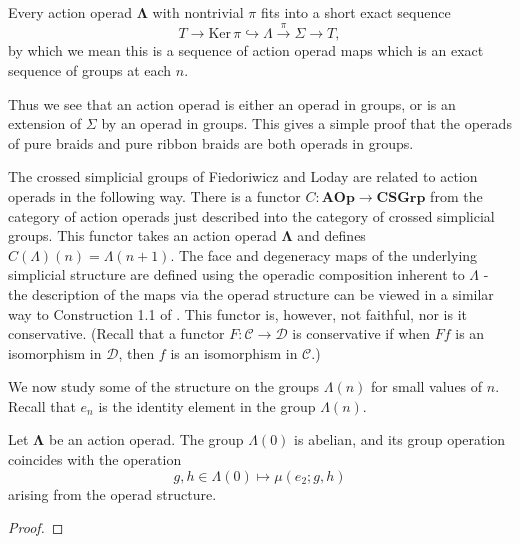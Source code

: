 \documentclass{amsbook} %
\newcommand{\ML}{\mathbf{\Lambda}}
\numberwithin{section}{chapter}
\begin{document}
\begin{cor}\label{extension}
Every action operad $\ML$ with nontrivial $\pi$ fits into a short exact sequence
  \[
    T \rightarrow \textrm{Ker}\,\pi \hookrightarrow \Lambda \stackrel{\pi}{\longrightarrow} \Sigma \rightarrow T,
  \]
by which we mean this is a sequence of action operad maps which is an exact sequence of groups at each $n$.
\end{cor}

\begin{rem}
Thus we see that an action operad is either an operad in groups, or is an extension of $\Sigma$ by an operad in groups. This gives a simple proof that the operads of pure braids and pure ribbon braids are both operads in groups.
\end{rem}

\begin{rem}\label{rem:crossed}
The crossed simplicial groups of Fiedoriwicz and Loday \cite{FL91} are related to action operads in the following way. There is a functor $C \colon \mathbf{AOp} \rightarrow \mathbf{CSGrp}$ from the category of action operads just described into the category of crossed simplicial groups. This functor takes an action operad $\ML$ and defines $C(\Lambda)(n) = \Lambda(n+1)$. The face and degeneracy maps of the underlying simplicial structure are defined using the operadic composition inherent to $\Lambda$ - the description of the maps via the operad structure can be viewed in a similar way to Construction 1.1 of \cite{Kra96}. This functor is, however, not faithful, nor is it conservative. (Recall that a functor $F \colon \mathcal{C} \rightarrow \mathcal{D}$ is conservative if when $Ff$ is an isomorphism in $\mathcal{D}$, then $f$ is an isomorphism in $\mathcal{C}$.)
\end{rem}

We now study some of the structure on the groups $\Lambda(n)$ for small values of $n$. Recall that $e_{n}$ is the identity element in the group $\Lambda(n)$.

\begin{lem}\label{G0abel}
Let $\ML$ be an action operad. The group $\Lambda(0)$ is abelian, and its group operation coincides with the operation 
  \[
    g, h \in \Lambda(0) \mapsto \mu(e_2; g, h)
  \]
arising from the operad structure.
\end{lem}
\begin{proof}
\end{proof}
\end{document}
